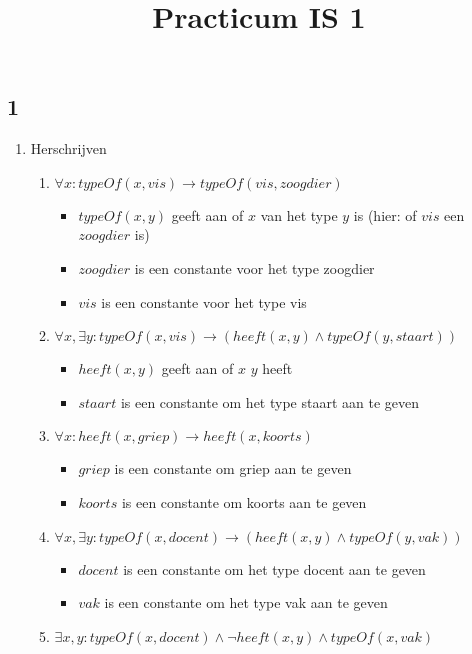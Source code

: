 \documentclass[]{article}
\title{Practicum IS 1}
\author{}
\date{}
\begin{document}
  \maketitle
  \subsection*{1}
  \begin{enumerate}[a]
    \item Herschrijven
    \begin{enumerate}[i]
      \item $ \forall x : typeOf(x,vis) \longrightarrow typeOf(vis, zoogdier) $
      \begin{itemize}
        \item $typeOf(x,y) $ geeft aan of $x$ van het type $y$ is (hier: of $vis$ een $zoogdier$ is)
        \item $zoogdier$ is een constante voor het type zoogdier
        \item $vis$ is een constante voor het type vis
      \end{itemize}
      \item $ \forall x, \exists y : typeOf(x,vis) \longrightarrow (heeft(x, y) \land typeOf(y,staart)) $
      \begin{itemize}
        \item $heeft(x,y) $ geeft aan of $x$ $y$ heeft
        \item $staart$ is een constante om het type staart aan te geven
      \end{itemize}
      \item $\forall x : heeft(x,griep) \longrightarrow heeft(x,koorts) $
      \begin{itemize}
        \item $griep$ is een constante om griep aan te geven
        \item $koorts$ is een constante om koorts aan te geven
      \end{itemize}
      \item $ \forall x, \exists y : typeOf(x,docent) \longrightarrow (heeft(x, y) \land typeOf(y,vak)) $
      \begin{itemize}
        \item $docent$ is een constante om het type docent aan te geven
        \item $vak$ is een constante om het type vak aan te geven
      \end{itemize}
      \item $ \exists x,y : typeOf(x,docent) \land \neg heeft(x,y) \land typeOf(x,vak) $

\end{enumerate}
\end{enumerate}
\end{document}
